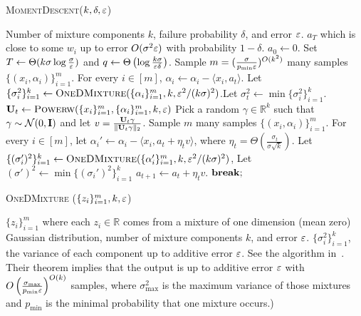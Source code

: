 \begin{algorithm}[!t]
\caption{ \textsc{MomentDescent}($k , \delta, \varepsilon$) \label{alg:one}}
\begin{algorithmic}[1]
\REQUIRE  Number of mixture components $k$, failure probability $\delta$, and error $\varepsilon$. 
\ENSURE $a_T$ which is close to some $w_i$ up to error $O(\sigma^2\varepsilon)$ with probability $1 -\delta$. 
\STATE $a_0 \leftarrow 0$. Set $T \leftarrow \Theta(k \sigma \log \frac{\sigma}{\varepsilon}) $ and $q \leftarrow \Theta\left(\log \frac{k\sigma}{\varepsilon\delta} \right)$. 
\STATE Sample $m  = (\frac{\sigma}{p_{\min}\varepsilon})^{O(k^2)}$
many samples $\{( x_i, \alpha_i) \}_{i = 1}^m $. 
\STATE For every $i \in [m]$, $\alpha_i \leftarrow \alpha_i - \langle x_i, a_t \rangle$.
\STATE  Let $\{ \sigma_i^2\}_{i = 1}^k \leftarrow \textsc{OneDMixture} ( \{ \alpha_i \}_{i = 1}^m, k,  \varepsilon^2/(k\sigma)^2)$.\STATE Let $\sigma_t^2 \leftarrow \min \{ \sigma_i^2\}_{i = 1}^k$. 
\STATE $\bold{U}_t \leftarrow  \textsc{Powerw}(\{ x_i \}_{i = 1}^m, \{ \alpha_i \}_{i = 1}^m, k,  \varepsilon)$
\STATE Pick a random $\gamma \in \mathbb{R}^k$ such that $\gamma \sim \mathcal{N}(0, \bold{I})$ and let $v = \frac{\bold{U}_t \gamma}{\| \bold{U}_t \gamma \|_2}$. 
\STATE  Sample $m$ many samples $\{ (x_i, \alpha_i) \}_{i = 1}^m $. 
\STATE  For every $i \in [m]$, let $\alpha_i' \leftarrow \alpha_i - \langle x_i, a_t + \eta_t v \rangle$, where $\eta_t = \Theta\left(\frac{\sigma_t}{\sigma\sqrt{k}} \right)$.
\STATE   Let $\{( \sigma_i')^2\}_{i = 1}^k \leftarrow \textsc{OneDMixture} ( \{\alpha_i' \}_{i = 1}^m, k,  \varepsilon^2/(k\sigma)^2)$, 
\STATE Let $(\sigma')^2 \leftarrow \min \{ (\sigma_i')^2\}_{i = 1}^k$
\STATE $a_{t + 1} \leftarrow a_t + \eta_t v$.
\STATE $\bold{break;}$
\ENDIF
\ENDFOR
\ENDFOR
\end{algorithmic}
\end{algorithm}



\begin{algorithm}[!t]
\caption{ \textsc{OneDMixture} ($\{ z_i \}_{i = 1}^m, k, \varepsilon$) \label{alg:1_d}}
\begin{algorithmic}[1]
\REQUIRE $\{ z_i \}_{i = 1}^m$ where each $z_i \in \mathbb{R}$ comes from a mixture of one dimension (mean zero) Gaussian distribution, number of mixture components $k$, and error $\varepsilon$.
\ENSURE $\{\sigma_i^2\}_{i = 1}^k$, the variance of each component up to additive error $\varepsilon$.
\STATE See the algorithm in~\citep{moitra2010settling}. Their theorem implies that the output is up to additive error $\varepsilon$ with $O\left(\frac{\sigma_{\max}}{ p_{\min}\varepsilon } \right)^{O(k)}$ samples, where $\sigma_{\max}^2$ is the maximum variance of those mixtures and $ p_{\min}$ is the minimal probability that one mixture occurs.)
\end{algorithmic}
\end{algorithm}



